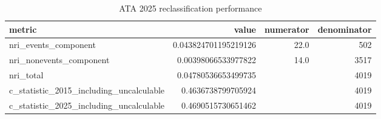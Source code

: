 \begin{table}[htbp]
\centering
\caption{ATA 2025 reclassification performance}
\label{tab:m036\_ata\_performance}
\begin{tabular}{lrrr}
\toprule
metric & value & numerator & denominator \\
\midrule
nri\_events\_component & 0.043824701195219126 & 22.0 & 502 \\
nri\_nonevents\_component & 0.00398066533977822 & 14.0 & 3517 \\
nri\_total & 0.04780536653499735 &  & 4019 \\
c\_statistic\_2015\_including\_uncalculable & 0.4636738799705924 &  & 4019 \\
c\_statistic\_2025\_including\_uncalculable & 0.4690515730651462 &  & 4019 \\
\bottomrule
\end{tabular}
\end{table}
